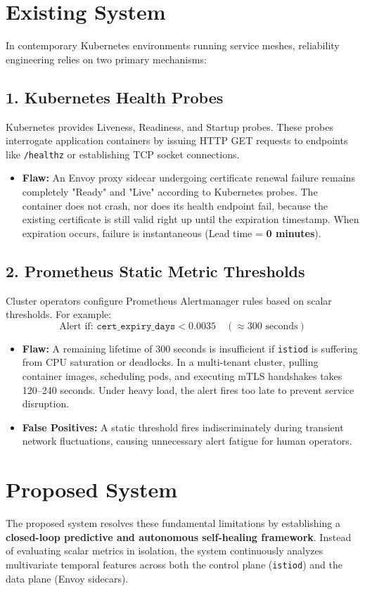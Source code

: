 \documentclass[12pt,a4paper]{report}
\begin{document}
\section{Existing System}
In contemporary Kubernetes environments running service meshes, reliability engineering relies on two primary mechanisms:

\subsection*{1. Kubernetes Health Probes}
Kubernetes provides Liveness, Readiness, and Startup probes. These probes interrogate application containers by issuing HTTP GET requests to endpoints like \texttt{/healthz} or establishing TCP socket connections.
\begin{itemize}
    \item \textbf{Flaw:} An Envoy proxy sidecar undergoing certificate renewal failure remains completely "Ready" and "Live" according to Kubernetes probes. The container does not crash, nor does its health endpoint fail, because the existing certificate is still valid right up until the expiration timestamp. When expiration occurs, failure is instantaneous (Lead time = \textbf{0 minutes}).
\end{itemize}

\subsection*{2. Prometheus Static Metric Thresholds}
Cluster operators configure Prometheus Alertmanager rules based on scalar thresholds. For example:
$$\text{Alert if: } \texttt{cert\_expiry\_days} < 0.0035 \quad (\approx 300\text{ seconds})$$
\begin{itemize}
    \item \textbf{Flaw:} A remaining lifetime of 300 seconds is insufficient if \texttt{istiod} is suffering from CPU saturation or deadlocks. In a multi-tenant cluster, pulling container images, scheduling pods, and executing mTLS handshakes takes 120–240 seconds. Under heavy load, the alert fires too late to prevent service disruption.
    \item \textbf{False Positives:} A static threshold fires indiscriminately during transient network fluctuations, causing unnecessary alert fatigue for human operators.
\end{itemize}

\section{Proposed System}
The proposed system resolves these fundamental limitations by establishing a \textbf{closed-loop predictive and autonomous self-healing framework}. Instead of evaluating scalar metrics in isolation, the system continuously analyzes multivariate temporal features across both the control plane (\texttt{istiod}) and the data plane (Envoy sidecars).
\end{document}

